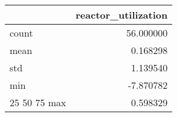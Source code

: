 \begin{tabular}{lr}
\toprule
 & reactor\_utilization \\
\midrule
count & 56.000000 \\
mean & 0.168298 \\
std & 1.139540 \\
min & -7.870782 \\
25%
50%
75%
max & 0.598329 \\
\bottomrule
\end{tabular}

